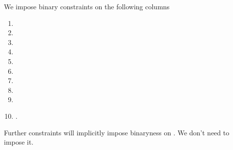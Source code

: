 We impose binary constraints on the following columns
\begin{multicols}{5}
\begin{enumerate}
	\item \isSmod {}
	\item \isMod  {}
	\item \isSdiv {}
	\item \isDiv  {}
	\item \oli{}
	\item \mli{}
	\item {}
	\item {}
	\item {}
	\item {}.
\end{enumerate}
\end{multicols}
\saNote{} Further constraints will implicitly impose binaryness on \instSigned{}. We don't need to impose it.
